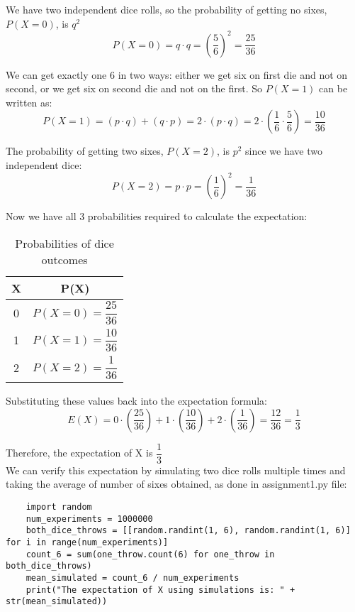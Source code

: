 \documentclass[journal,12pt,twocolumn]{IEEEtran}
\begin{document}
\noindent We have two independent dice rolls, so the probability of getting no sixes, $P(X = 0)$, is $q^2$
\[ P(X = 0) = q \cdot q =  \left(\frac{5}{6}\right)^2 = \frac{25}{36} \]

\noindent We can get exactly one 6 in two ways: either we get six on first die and not on second, or we get six on second die and not on the first. So $P(X = 1)$ can be written as:
\[ P(X = 1) = (p \cdot q) + (q \cdot p) = 2 \cdot (p \cdot q) = 2 \cdot \left(\frac{1}{6} \cdot \frac{5}{6}\right) = \frac{10}{36} \]

\noindent The probability of getting two sixes, $P(X = 2)$, is $p^2$ since we have two independent dice:
\[ P(X = 2) = p \cdot p = \left(\frac{1}{6}\right)^2 = \frac{1}{36} \]

\noindent Now we have all 3 probabilities required to calculate the expectation:

\begin{table}[!htbp]
\centering
\begin{tabular}{|c|c|}
\hline
X & P(X) \\
\hline
\hline
0 & $P(X = 0) = \dfrac{25}{36}$ \\
\hline
1 & $P(X = 1) = \dfrac{10}{36}$ \\
\hline
2 & $P(X = 2) = \dfrac{1}{36}$ \\
\hline

\end{tabular}
\caption*{\label{table 2}Probabilities of dice outcomes}
\end{table}


\noindent Substituting these values back into the expectation formula:
\[ E(X) = 0 \cdot \left(\frac{25}{36}\right) + 1 \cdot \left(\frac{10}{36}\right) + 2 \cdot \left(\frac{1}{36}\right) = \frac{12}{36} = \frac{1}{3} \]

Therefore, the expectation of X is ${\dfrac{1}{3}}$
\\

\newpage
\noindent We can verify this expectation by simulating two dice rolls multiple times and taking the average of number of sixes obtained, as done in assignment1.py file:
\\
\begin{mdframed}[style=codebox]
\lstset{style=mystyle}
\begin{lstlisting}
    import random
    num_experiments = 1000000
    both_dice_throws = [[random.randint(1, 6), random.randint(1, 6)] for i in range(num_experiments)]
    count_6 = sum(one_throw.count(6) for one_throw in both_dice_throws)
    mean_simulated = count_6 / num_experiments
    print("The expectation of X using simulations is: " + str(mean_simulated))
\end{lstlisting}
\end{mdframed}
\end{document}
